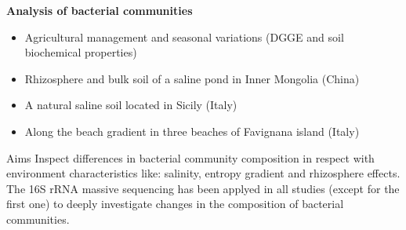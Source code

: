 \documentclass[10pt]{beamer}
\begin{document}
\newif\ifsoulseek
\soulseektrue

\ifsoulseek
\begin{frame}
	\textbf{\Large{Analysis of bacterial communities}}
	\vspace{5mm}
	\begin{itemize}
		\item \alert{Agricultural management and seasonal variations (DGGE and soil biochemical properties)}
		\item Rhizosphere and bulk soil of a saline pond in Inner Mongolia (China)
		\item A natural saline soil located in Sicily (Italy)
		\item Along the beach gradient in three beaches of Favignana island (Italy)
	\end{itemize}
	\vspace{3mm}
	\begin{block}{Aims}
		Inspect differences in bacterial community composition in respect with environment characteristics like: salinity, entropy gradient and rhizosphere effects. The 16S rRNA massive sequencing has been applyed in all studies (except for the first one) to deeply investigate changes in the composition of bacterial communities.
	\end{block}
\end{frame}
\else
\begin{frame}
	\textbf{\Large{Analysis of bacterial communities}}
	\vspace{5mm}
	\begin{itemize}
		\item Rhizosphere and bulk soil of a saline pond in Inner Mongolia (China)
		\item A natural saline soil located in Sicily (Italy)
		\item Along the beach gradient in three beaches of Favignana island (Italy)
	\end{itemize}
	\vspace{3mm}
	\begin{block}{Aims}
		Inspect differences in bacterial community composition in respect with environment characteristics like: salinity, entropy gradient and rhizosphere effects. In all studies the 16S rRNA massive sequencing has been applyed to deeply investigate changes in the composition of bacterial communities.
	\end{block}
\end{frame}
\fi
\end{document}
